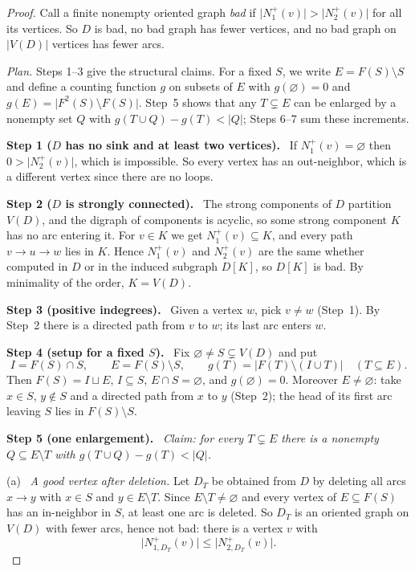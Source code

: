 \documentclass[11pt]{article}
\theoremstyle{remark}
\newcommand{\abs}[1]{\lvert #1\rvert}
\newcommand{\step}[1]{\par\medskip\noindent\textbf{Step #1.}\ }
\newcommand{\substep}[1]{\par\smallskip\noindent\textup{(#1)}\ }
\begin{document}
\begin{proof}
Call a finite nonempty oriented graph \emph{bad} if
$\abs{N_1^+(v)}>\abs{N_2^+(v)}$ for all its vertices. So $D$ is bad, no bad
graph has fewer vertices, and no bad graph on $\abs{V(D)}$ vertices has fewer
arcs.

\emph{Plan.} Steps 1--3 give the structural claims. For a fixed $S$, we write
$E=F(S)\setminus S$ and define a counting function $g$ on subsets of $E$
with $g(\varnothing)=0$ and $g(E)=\abs{F^2(S)\setminus F(S)}$. Step~5 shows
that any $T\subsetneq E$ can be enlarged by a nonempty set $Q$ with
$g(T\cup Q)-g(T)<\abs Q$; Steps 6--7 sum these increments.

\step{1 ($D$ has no sink and at least two vertices)}
If $N_1^+(v)=\varnothing$ then $0>\abs{N_2^+(v)}$, which is impossible. So
every vertex has an out-neighbor, which is a different vertex since there are
no loops.

\step{2 ($D$ is strongly connected)}
The strong components of $D$ partition $V(D)$, and the digraph of components
is acyclic, so some strong component $K$ has no arc entering it. For $v\in K$
we get $N_1^+(v)\subseteq K$, and every path $v\to u\to w$ lies in $K$. Hence
$N_1^+(v)$ and $N_2^+(v)$ are the same whether computed in $D$ or in the
induced subgraph $D[K]$, so $D[K]$ is bad. By minimality of the order,
$K=V(D)$.

\step{3 (positive indegrees)}
Given a vertex $w$, pick $v\ne w$ (Step~1). By Step~2 there is a directed path
from $v$ to $w$; its last arc enters $w$.

\step{4 (setup for a fixed $S$)}
Fix $\varnothing\ne S\subsetneq V(D)$ and put
\[
  I=F(S)\cap S,\qquad E=F(S)\setminus S,
  \qquad g(T)=\abs{F(T)\setminus(I\cup T)}\quad(T\subseteq E).
\]
Then $F(S)=I\sqcup E$, $I\subseteq S$, $E\cap S=\varnothing$, and
$g(\varnothing)=0$. Moreover $E\ne\varnothing$: take $x\in S$, $y\notin S$ and
a directed path from $x$ to $y$ (Step~2); the head of its first arc leaving
$S$ lies in $F(S)\setminus S$.

\step{5 (one enlargement)}
\emph{Claim: for every $T\subsetneq E$ there is a nonempty
$Q\subseteq E\setminus T$ with $g(T\cup Q)-g(T)<\abs Q$.}

\substep{a} \emph{A good vertex after deletion.}
Let $D_T$ be obtained from $D$ by deleting all arcs $x\to y$ with $x\in S$ and
$y\in E\setminus T$. Since $E\setminus T\neq\varnothing$ and every vertex of
$E\subseteq F(S)$ has an in-neighbor in $S$, at least one arc is deleted.
So $D_T$ is an oriented graph on $V(D)$ with fewer arcs, hence not bad: there
is a vertex $v$ with
\begin{equation}\label{eq:good-after-deletion}
 \abs{N_{1,D_T}^+(v)}\le\abs{N_{2,D_T}^+(v)} .
\end{equation}


\end{proof}
\end{document}
